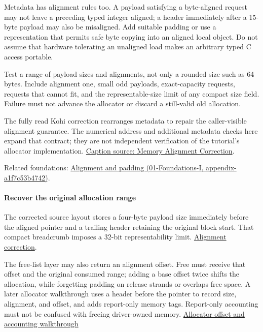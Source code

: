 Metadata has alignment rules too. A payload satisfying a byte-aligned request may not leave a preceding typed integer aligned; a header immediately after a 15-byte payload may also be misaligned. Add suitable padding or use a representation that permits safe byte copying into an aligned local object. Do not assume that hardware tolerating an unaligned load makes an arbitrary typed C access portable.

Test a range of payload sizes and alignments, not only a rounded size such as 64 bytes. Include alignment one, small odd payloads, exact-capacity requests, requests that cannot fit, and the representable-size limit of any compact size field. Failure must not advance the allocator or discard a still-valid old allocation.

The fully read Kohi correction rearranges metadata to repair the caller-visible alignment guarantee. The numerical address and additional metadata checks here expand that contract; they are not independent verification of the tutorial's allocator implementation. \href{https://www.youtube.com/watch?v=VQ6Q9B_WDlM}{Caption source: Memory Alignment Correction}.

Related foundations: \href{../01-Foundations-I/main.pdf\#nameddest=appendix-a1f7c53b4742}{Alignment and padding (01-Foundations-I, appendix-a1f7c53b4742)}.

\paragraph{Recover the original allocation range}\label{05-engine-i-ch014-recover-the-original-allocation-range}

The corrected source layout stores a four-byte payload size immediately before the aligned pointer and a trailing header retaining the original block start. That compact breadcrumb imposes a 32-bit representability limit. \href{https://www.youtube.com/watch?v=VQ6Q9B_WDlM}{Alignment correction}.

The free-list layer may also return an alignment offset. Free must receive that offset and the original consumed range; adding a base offset twice shifts the allocation, while forgetting padding on release strands or overlaps free space. A later allocator walkthrough uses a header before the pointer to record size, alignment, and offset, and adds report-only memory tags. Report-only accounting must not be confused with freeing driver-owned memory. \href{https://www.youtube.com/watch?v=Fo9ri9DMu74}{Allocator offset and accounting walkthrough}

